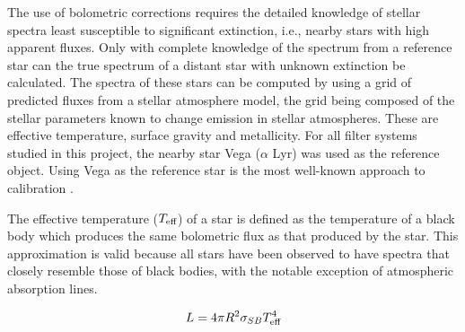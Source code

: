 \documentclass[12pt, a4paper]{report}
\begin{document}
The use of bolometric corrections requires the detailed knowledge of stellar spectra least susceptible to significant extinction, i.e., nearby stars with high apparent fluxes. Only with complete knowledge of the spectrum from a reference star can the true spectrum of a distant star with unknown extinction be calculated. The spectra of these stars can be computed by using a grid of predicted fluxes from a stellar atmosphere model, the grid being composed of the stellar parameters known to change emission in stellar atmospheres. These are effective temperature, surface gravity and metallicity. For all filter systems studied in this project, the nearby star Vega ($\alpha$ Lyr) was used as the reference object. Using Vega as the reference star is the most well-known approach to calibration \citep{2014MNRAS.444..392C}.

The effective temperature ($T_{\textnormal{eff}}$) of a star is defined as the temperature of a black body which produces the same bolometric flux as that produced by the star. This approximation is valid because all stars have been observed to have spectra that closely resemble those of black bodies, with the notable exception of atmospheric absorption lines.

\begin{equation}
L = 4 \pi R^{2} \sigma_{SB} T_{\textnormal{eff}}^{4}
\label{Teff_def}
\end{equation}
\end{document}
